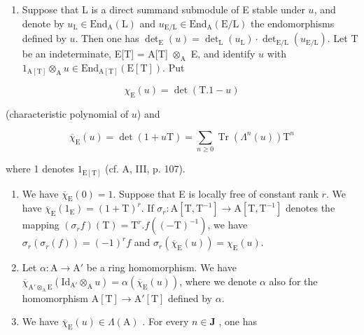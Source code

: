 \begin{enumerate}
\def\labelenumi{\alph{enumi})}
\setcounter{enumi}{1}
\tightlist
\item
  Suppose that L is a direct summand submodule of E stable under \(u\), and denote by \(u_{\mathrm{L}} \in \mathrm{End}_{\mathrm{A}}(\mathrm{L})\) and \(u_{\mathrm{E/L}} \in \mathrm{End}_{\mathrm{A}}(\mathrm{E/L})\) the endomorphisms defined by \(u\). Then one has \(\det_{\mathrm{E}}(u) = \det_{\mathrm{L}}(u_{\mathrm{L}}) \cdot \det_{\mathrm{E/L}}(u_{\mathrm{E/L}})\). Let T be an indeterminate, E{[}T{]} = A{[}T{]} \(\otimes_{\mathrm{A}}\) E, and identify \(u\) with \(1_{\mathrm{A[T]}} \otimes_{\mathrm{A}} u \in \mathrm{End}_{\mathrm{A[T]}}(\mathrm{E[T]})\). Put
\end{enumerate}

\[
\chi_ {\mathrm{E}} (u) = \det (\mathrm{T}. 1 - u)
\]

(characteristic polynomial of \(u\)) and

\[
\overline {{{{\chi}}}} _ {\mathrm{E}} (u) = \det (1 + u \mathrm{T}) = \sum_ {n \geqslant 0} \operatorname{Tr} \left(\Lambda ^ {n} (u)\right) \mathrm{T} ^ {n}
\]

where 1 denotes \(1_{\mathrm{E[T]}}\) (cf. A, III, p. 107).

\begin{enumerate}
\def\labelenumi{\alph{enumi})}
\setcounter{enumi}{2}
\item
  We have \(\overline{\chi}_{\mathrm{E}}(0) = 1\). Suppose that E is locally free of constant rank \(r\). We have \(\overline{\chi}_{\mathrm{E}}(1_{\mathrm{E}}) = (1 + \mathrm{T})^{r}\). If \(\sigma_r: \mathrm{A}[\mathrm{T}, \mathrm{T}^{-1}] \to \mathrm{A}[\mathrm{T}, \mathrm{T}^{-1}]\) denotes the mapping \((\sigma_r f)(\mathrm{T}) = \mathrm{T}^r. f((- \mathrm{T})^{-1})\), we have \(\sigma_r(\sigma_r(f)) = (-1)^r f\) and \(\sigma_r(\overline{\chi}_{\mathrm{E}}(u)) = \chi_{\mathrm{E}}(u)\).
\item
  Let \(\alpha: \mathrm{A} \to \mathrm{A}'\) be a ring homomorphism. We have \(\overline{\chi}_{\mathrm{A}'\otimes_{\mathrm{A}}\mathrm{E}}(\mathrm{Id}_{\mathrm{A}'} \otimes_{\mathrm{A}} u) = \alpha(\overline{\chi}_{\mathrm{E}}(u))\), where we denote \(\alpha\) also for the homomorphism \(\mathrm{A}[\mathrm{T}] \to \mathrm{A}'[\mathrm{T}]\) defined by \(\alpha\).
\item
  We have \(\overline{\chi}_{\mathrm{E}}(u) \in \Lambda(\mathrm{A})\) . For every \(n \in \mathbf{J}\) , one has
\end{enumerate}

